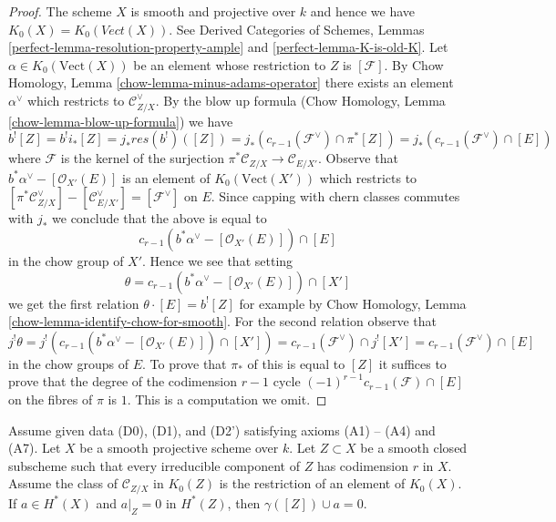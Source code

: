 \begin{proof}
The scheme $X$ is smooth and projective over $k$ and hence we have
$K_0(X) = K_0(\textit{Vect}(X))$. See
Derived Categories of Schemes, Lemmas
\ref{perfect-lemma-resolution-property-ample} and
\ref{perfect-lemma-K-is-old-K}.
Let $\alpha \in K_0(\text{Vect}(X))$ be an element
whose restriction to $Z$ is $[\mathcal{F}]$.
By Chow Homology, Lemma \ref{chow-lemma-minus-adams-operator}
there exists an element $\alpha^\vee$ which restricts to
$\mathcal{C}_{Z/X}^\vee$. By the blow up formula
(Chow Homology, Lemma \ref{chow-lemma-blow-up-formula})
we have
$$
b^![Z] = b^!i_*[Z] = j_* res(b^!)([Z]) =
j_*(c_{r - 1}(\mathcal{F}^\vee) \cap \pi^*[Z]) =
j_*(c_{r - 1}(\mathcal{F}^\vee) \cap [E])
$$
where $\mathcal{F}$ is the kernel of the surjection
$\pi^*\mathcal{C}_{Z/X} \to \mathcal{C}_{E/X'}$.
Observe that $b^*\alpha^\vee - [\mathcal{O}_{X'}(E)]$
is an element of $K_0(\text{Vect}(X'))$ which
restricts to $[\pi^*\mathcal{C}_{Z/X}^\vee] - [\mathcal{C}_{E/X'}^\vee] =
[\mathcal{F}^\vee]$ on $E$. Since capping with chern classes
commutes with $j_*$ we conclude that the above is equal to
$$
c_{r - 1}(b^*\alpha^\vee - [\mathcal{O}_{X'}(E)]) \cap [E]
$$
in the chow group of $X'$. Hence we see that setting
$$
\theta = c_{r - 1}(b^*\alpha^\vee - [\mathcal{O}_{X'}(E)]) \cap [X']
$$
we get the first relation $\theta \cdot [E] = b^![Z]$
for example by Chow Homology, Lemma \ref{chow-lemma-identify-chow-for-smooth}.
For the second relation observe that
$$
j^!\theta = j^!(c_{r - 1}(b^*\alpha^\vee - [\mathcal{O}_{X'}(E)]) \cap [X'])
= c_{r - 1}(\mathcal{F}^\vee) \cap j^![X'] =
c_{r - 1}(\mathcal{F}^\vee) \cap [E]
$$
in the chow groups of $E$. To prove that $\pi_*$ of this is equal to $[Z]$ it
suffices to prove that the degree of the codimension $r - 1$ cycle
$(-1)^{r - 1}c_{r - 1}(\mathcal{F}) \cap [E]$ on the fibres of $\pi$ is $1$.
This is a computation we omit.
\end{proof}

\begin{lemma}
\label{lemma-A5-A6-imply}
Assume given data (D0), (D1), and (D2') satisfying axioms (A1) -- (A4)
and (A7). Let $X$ be a smooth projective scheme over $k$. Let $Z \subset X$
be a smooth closed subscheme such that every irreducible component of $Z$
has codimension $r$ in $X$. Assume the class of
$\mathcal{C}_{Z/X}$ in $K_0(Z)$ is the restriction of an element of $K_0(X)$.
If $a \in H^*(X)$ and $a|_Z = 0$ in $H^*(Z)$, then
$\gamma([Z]) \cup a = 0$.
\end{lemma}

